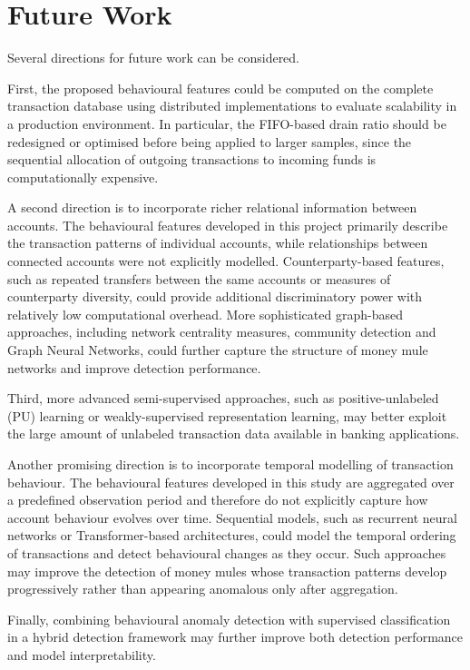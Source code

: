 \section{Future Work}
Several directions for future work can be considered. 

First, the proposed behavioural
features could be computed on the complete transaction database using distributed
implementations to evaluate scalability in a production environment. In particular, the FIFO-based drain ratio should be redesigned or optimised before being applied to larger samples, since the sequential allocation of outgoing transactions to incoming funds is computationally expensive.

A second direction is to incorporate richer relational information between accounts. The behavioural features developed in this project primarily describe the transaction patterns of individual accounts, while relationships between connected accounts were not explicitly modelled. Counterparty-based features, such as repeated transfers between the same accounts or measures of counterparty diversity, could provide additional discriminatory power with relatively low computational overhead. More sophisticated graph-based approaches, including network centrality measures, community detection and Graph Neural Networks, could further capture the structure of money mule networks and improve detection performance.

Third, more advanced semi-supervised approaches, such as positive-unlabeled (PU) learning
or weakly-supervised representation learning, may better exploit the large amount of
unlabeled transaction data available in banking applications. 

Another promising direction is to incorporate temporal modelling of transaction behaviour. The behavioural features developed in this study are aggregated over a predefined observation period and therefore do not explicitly capture how account behaviour evolves over time. Sequential models, such as recurrent neural networks or Transformer-based architectures, could model the temporal ordering of transactions and detect behavioural changes as they occur. Such approaches may improve the detection of money mules whose transaction patterns develop progressively rather than appearing anomalous only after aggregation.

Finally, combining
behavioural anomaly detection with supervised classification in a hybrid detection
framework may further improve both detection performance and model interpretability.
